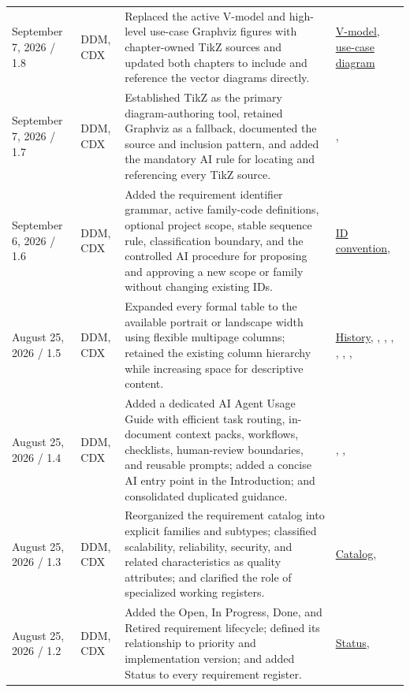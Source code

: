 \begin{tabularx}{\linewidth}{L{3.1cm}L{2.2cm}YL{2.0cm}}
September 7, 2026 / 1.8 & DDM, CDX & Replaced the active V-model and high-level use-case Graphviz figures with chapter-owned TikZ sources and updated both chapters to include and reference the vector diagrams directly. & \hyperref[Figure:VModel]{V-model}, \hyperref[Figure:UseCaseDiagram]{use-case diagram}\\
September 7, 2026 / 1.7 & DDM, CDX & Established TikZ as the primary diagram-authoring tool, retained Graphviz as a fallback, documented the source and inclusion pattern, and added the mandatory AI rule for locating and referencing every TikZ source. & , \\
September 6, 2026 / 1.6 & DDM, CDX & Added the requirement identifier grammar, active family-code definitions, optional project scope, stable sequence rule, classification boundary, and the controlled AI procedure for proposing and approving a new scope or family without changing existing IDs. & \hyperref[Table:RequirementIdentifierConvention]{ID convention}, \\
August 25, 2026 / 1.5 & DDM, CDX & Expanded every formal table to the available portrait or landscape width using flexible multipage columns; retained the existing column hierarchy while increasing space for descriptive content. & \hyperref[Table:DocumentHistory]{History}, , , , , , , \\
August 25, 2026 / 1.4 & DDM, CDX & Added a dedicated AI Agent Usage Guide with efficient task routing, in-document context packs, workflows, checklists, human-review boundaries, and reusable prompts; added a concise AI entry point in the Introduction; and consolidated duplicated guidance. & , , \\
August 25, 2026 / 1.3 & DDM, CDX & Reorganized the requirement catalog into explicit families and subtypes; classified scalability, reliability, security, and related characteristics as quality attributes; and clarified the role of specialized working registers. & \hyperref[Table:RequirementCategoryCatalog]{Catalog}, \\
August 25, 2026 / 1.2 & DDM, CDX & Added the Open, In Progress, Done, and Retired requirement lifecycle; defined its relationship to priority and implementation version; and added Status to every requirement register. & \hyperref[Table:RequirementStatusDefinitions]{Status}, \\

\end{tabularx}
